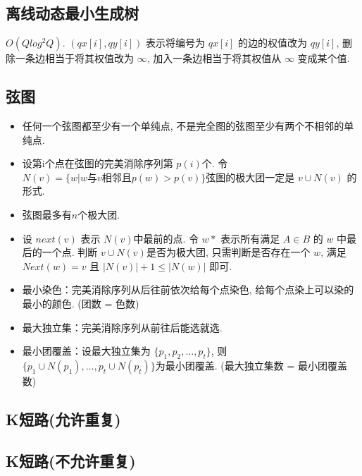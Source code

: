 \documentclass[landscape, twocolumn, 8pt, a4paper, twoside]{extarticle}
\begin{document}
\subsection{离线动态最小生成树}
$O (Q log^2 Q) $.
$(qx[i], qy[i])$ 表示将编号为 $qx[i]$ 的边的权值改为 $qy[i]$,
删除一条边相当于将其权值改为 $\infty$,
加入一条边相当于将其权值从 $\infty$ 变成某个值.


\subsection{弦图}
\begin{itemize}
\item 任何一个弦图都至少有一个单纯点, 不是完全图的弦图至少有两个不相邻的单纯点. 
\item 设第i个点在弦图的完美消除序列第 $p(i)$个. 令 $N(v) = \{w | w \text{与} v \text{相邻且} p(w) > p(v) \}$弦图的极大团一定是 $v \cup N(v)$ 的形式. 
\item 弦图最多有$n$个极大团. 
\item 设 $next(v)$ 表示 $N(v)$中最前的点. 令 $w*$ 表示所有满足 $A\in B$ 的 $w$ 中最后的一个点. 
  判断 $v \cup N(v)$是否为极大团,
  只需判断是否存在一个 $w$, 
  满足 $Next(w) = v$ 且 $|N(v)| + 1 \le |N(w)|$ 即可. 
\item 最小染色：完美消除序列从后往前依次给每个点染色, 给每个点染上可以染的最小的颜色. (团数 = 色数)
\item 最大独立集：完美消除序列从前往后能选就选. 
\item 最小团覆盖：设最大独立集为 $\{p_1, p_2, \ldots, p_t\}$, 则 $\{p_1 \cup N(p_1), \ldots, p_t \cup N(p_t) \}$为最小团覆盖.  (最大独立集数 = 最小团覆盖数)
\end{itemize}



\subsection{K短路(允许重复)}


\subsection{K短路(不允许重复)}

\end{document}
